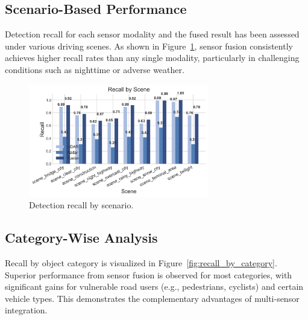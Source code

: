 \documentclass[10pt, a4paper, oneside]{article}
\begin{document}
\begin{figure}[H]
	\centering
\end{figure}

\subsection{Scenario-Based Performance}
Detection recall for each sensor modality and the fused result has been assessed under various driving scenes. As shown in Figure~\ref{fig:recall_by_scene}, sensor fusion consistently achieves higher recall rates than any single modality, particularly in challenging conditions such as nighttime or adverse weather.

\begin{figure}[H]
    \centering
    \includegraphics[width=0.7\textwidth]{../output/plots/recall_by_scene.png}
    \caption{Detection recall by scenario.}
    \label{fig:recall_by_scene}
\end{figure}

\begin{small}
\end{small}


\subsection{Category-Wise Analysis}
Recall by object category is visualized in Figure~\ref{fig:recall_by_category}. Superior performance from sensor fusion is observed for most categories, with significant gains for vulnerable road users (e.g., pedestrians, cyclists) and certain vehicle types. This demonstrates the complementary advantages of multi-sensor integration.
\end{document}
